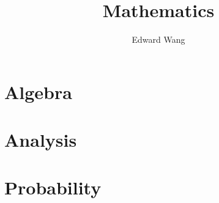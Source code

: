 \documentclass[twoside=false, DIV=calc]{scrbook}
\begin{document}
\title{Mathematics}
\author{Edward Wang}
\date{\the\year}
\maketitle

\tableofcontents

\part{Algebra}


\part{Analysis}

\part{Probability}

\end{document}
